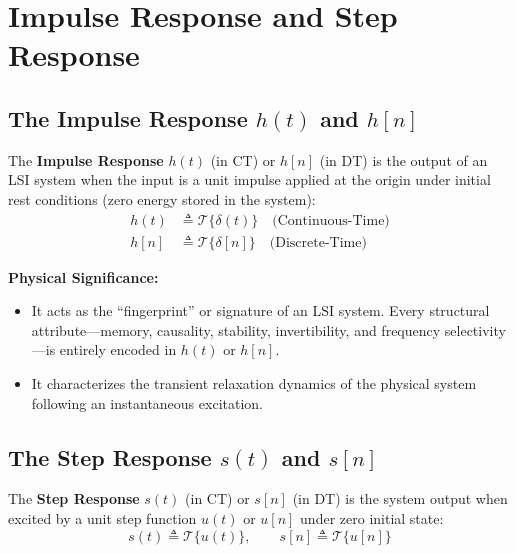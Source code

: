\documentclass[12pt,a4paper]{article}
\begin{document}
\section{Impulse Response and Step Response}

\subsection{The Impulse Response $h(t)$ and $h[n]$}

\begin{tcolorbox}[defbox, title={\textbf{Definition: Impulse Response}}]
The \textbf{Impulse Response} $h(t)$ (in CT) or $h[n]$ (in DT) is the output of an LSI system when the input is a unit impulse applied at the origin under initial rest conditions (zero energy stored in the system):
\begin{align}
  h(t) &\triangleq \mathcal{T}\{\delta(t)\} \quad \text{(Continuous-Time)} \\
  h[n] &\triangleq \mathcal{T}\{\delta[n]\} \quad \text{(Discrete-Time)}
\end{align}
\end{tcolorbox}

\textbf{Physical Significance:}
\begin{itemize}[topsep=2pt, itemsep=2pt]
  \item It acts as the ``fingerprint'' or signature of an LSI system. Every structural attribute—memory, causality, stability, invertibility, and frequency selectivity—is entirely encoded in $h(t)$ or $h[n]$.
  \item It characterizes the transient relaxation dynamics of the physical system following an instantaneous excitation.
\end{itemize}

\subsection{The Step Response $s(t)$ and $s[n]$}

\begin{tcolorbox}[defbox, title={\textbf{Definition: Step Response}}]
The \textbf{Step Response} $s(t)$ (in CT) or $s[n]$ (in DT) is the system output when excited by a unit step function $u(t)$ or $u[n]$ under zero initial state:
\begin{equation}
  s(t) \triangleq \mathcal{T}\{u(t)\}, \qquad s[n] \triangleq \mathcal{T}\{u[n]\}
\end{equation}
\end{tcolorbox}
\end{document}
